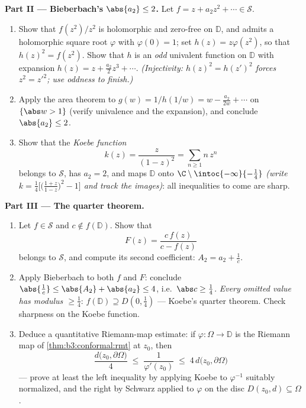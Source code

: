 \begin{problem}
\medskip
\noindent\textbf{Part II --- Bieberbach's $\abs{a_2} \leq
2$.} Let $f = z + a_2z^2 + \cdots \in \mathcal S$.
\begin{enumerate}[resume]
  \item Show that $f(z^2)/z^2$ is holomorphic and zero-free
        on $\mathbb D$, and admits a holomorphic square root
        $\varphi$ with $\varphi(0) = 1$; set $h(z) =
        z\varphi(z^2)$, so that $h(z)^2 = f(z^2)$. Show that
        $h$ is an \emph{odd} univalent function on $\mathbb
        D$ with expansion $h(z) = z + \frac{a_2}2z^3 +
        \cdots$. \emph{(Injectivity: $h(z)^2 = h(z')^2$
        forces $z^2 = z'^2$; use oddness to finish.)}
  \item Apply the area theorem to $g(w) = 1/h(1/w) = w -
        \frac{a_2}{2w} + \cdots$ on $\{\abs w > 1\}$
        (verify univalence and the expansion), and conclude
        $\abs{a_2} \leq 2$.
  \item Show that the \emph{Koebe function}
        \[
        k(z) = \frac{z}{(1 - z)^2} = \sum_{n\geq1}n\,z^n
        \]
        belongs to $\mathcal S$, has $a_2 = 2$, and maps
        $\mathbb D$ onto $\C\setminus\intoc{-\infty}{-\frac14}$
        \emph{(write $k = \frac14\bigl[\bigl(\frac{1+z}{1 -
        z}\bigr)^2 - 1\bigr]$ and track the images)}: all
        inequalities to come are sharp.
\end{enumerate}

\medskip
\noindent\textbf{Part III --- The quarter theorem.}
\begin{enumerate}[resume]
  \item Let $f \in \mathcal S$ and $c \notin f(\mathbb D)$.
        Show that
        \[
        F(z) = \frac{c\,f(z)}{c - f(z)}
        \]
        belongs to $\mathcal S$, and compute its second
        coefficient: $A_2 = a_2 + \frac1c$.
  \item Apply Bieberbach to both $f$ and $F$: conclude
        $\abs{\frac1c} \leq \abs{A_2} + \abs{a_2} \leq 4$,
        i.e.\ $\abs c \geq \frac14$. \emph{Every omitted value
        has modulus $\geq \frac14$}: $f(\mathbb D) \supseteq
        D(0, \frac14)$ --- Koebe's quarter theorem. Check
        sharpness on the Koebe function.
  \item Deduce a quantitative Riemann-map estimate: if
        $\varphi \colon \Omega \to \mathbb D$ is the Riemann
        map of \cref{thm:b3:conformal:rmt} at $z_0$, then
        \[
        \frac{d\bigl(z_0, \partial\Omega\bigr)}{4}
        \;\leq\; \frac1{\varphi'(z_0)} \;\leq\;
        4\,d\bigl(z_0, \partial\Omega\bigr)
        \]
        --- prove at least the left inequality by applying
        Koebe to $\varphi^{-1}$ suitably normalized, and the
        right by Schwarz applied to $\varphi$ on the disc
        $D(z_0, d) \subseteq \Omega$.
\end{enumerate}


\end{problem}
